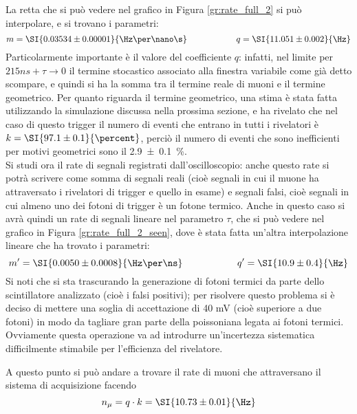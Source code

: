 La retta che si può vedere nel grafico in Figura \ref{gr:rate_full_2} si può interpolare, e si trovano i parametri:
\begin{equation}
  m = \SI{0.03534 \pm 0.00001}{\Hz\per\nano\s} \hspace{2cm} q = \SI{11.051 \pm 0.002}{\Hz}
\end{equation}
Particolarmente importante è il valore del coefficiente $q$: infatti, nel limite per $ 215 ns + \tau \to 0$ il termine stocastico associato alla finestra variabile come già detto scompare, e quindi si ha la somma tra il termine reale di muoni e il termine geometrico. Per quanto riguarda il termine geometrico, una stima è stata fatta utilizzando la simulazione discussa nella prossima sezione, e ha rivelato che nel caso di questo trigger il numero di eventi che entrano in tutti i rivelatori è $k = \SI{97.1 \pm 0.1}{\percent}$, perciò il numero di eventi che sono inefficienti per motivi geometrici sono il \SI{2.9 \pm 0.1}{\percent}.\\

Si studi ora il rate di segnali registrati dall'oscilloscopio: anche questo rate si potrà scrivere come somma di segnali reali (cioè segnali in cui il muone ha attraversato i rivelatori di trigger e quello in esame) e segnali falsi, cioè segnali in cui almeno uno dei fotoni di trigger è un fotone termico. Anche in questo caso si avrà quindi un rate di segnali lineare nel parametro $\tau$, che si può vedere nel grafico in Figura \ref{gr:rate_full_2_seen}, dove è stata fatta un'altra interpolazione lineare che ha trovato i parametri:
\begin{equation}
  m' = \SI{0.0050 \pm 0.0008}{\Hz\per\ns} \hspace{2cm} q' = \SI{10.9 \pm 0.4}{\Hz}
\end{equation}
Si noti che si sta trascurando la generazione di fotoni termici da parte dello scintillatore analizzato (cioè i falsi positivi); per risolvere questo problema si è deciso di mettere una soglia di accettazione di 40 mV (cioè superiore a due fotoni) in modo da tagliare gran parte della poissoniana legata ai fotoni termici. Ovviamente questa operazione va ad introdurre un'incertezza sistematica difficilmente stimabile per l'efficienza del rivelatore.\\

A questo punto si può andare a trovare il rate di muoni che attraversano il sistema di acquisizione facendo
\begin{equation}
  n_\mu = q \cdot k = \SI{10.73 \pm 0.01}{\Hz}
\end{equation}

